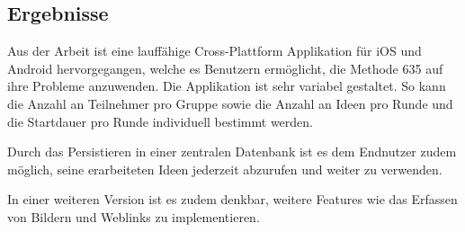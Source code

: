 \subsection{Ergebnisse}
Aus der Arbeit ist eine lauffähige Cross-Plattform Applikation für iOS und Android hervorgegangen, welche es Benutzern ermöglicht, die Methode 635 auf ihre Probleme anzuwenden. Die Applikation ist sehr variabel gestaltet. So kann die Anzahl an Teilnehmer pro Gruppe sowie die Anzahl an Ideen pro Runde und die Startdauer pro Runde individuell bestimmt werden. 

Durch das Persistieren in einer zentralen Datenbank ist es dem Endnutzer zudem möglich, seine erarbeiteten Ideen jederzeit abzurufen und weiter zu verwenden. 

In einer weiteren Version ist es zudem denkbar, weitere Features wie das Erfassen von Bildern und Weblinks zu implementieren.
